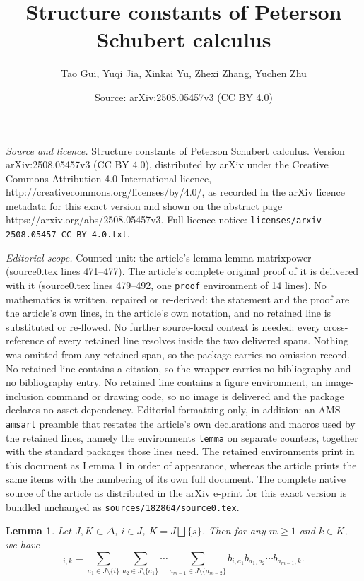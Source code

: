 \documentclass[10pt,a4paper]{amsart}
\title{Structure constants of Peterson Schubert calculus}
\author{Tao Gui, Yuqi Jia, Xinkai Yu, Zhexi Zhang, Yuchen Zhu}
\date{Source: arXiv:2508.05457v3 (CC BY 4.0)}
\newtheorem{lemma}{Lemma}
\begin{document}
\maketitle

\noindent\emph{Source and licence.} Structure constants of Peterson Schubert calculus. Version arXiv:2508.05457v3 (CC BY 4.0), distributed by arXiv under the Creative Commons Attribution 4.0 International licence, http://creativecommons.org/licenses/by/4.0/, as recorded in the arXiv licence metadata for this exact version and shown on the abstract page https://arxiv.org/abs/2508.05457v3. Full licence notice: \texttt{licenses/arxiv-2508.05457-CC-BY-4.0.txt}.\par\smallskip

\noindent\textit{Editorial scope.} Counted unit: the article's lemma lemma-matrixpower (source0.tex lines 471--477). The article's complete original proof of it is delivered with it (source0.tex lines 479--492, one \texttt{proof} environment of 14 lines). No mathematics is written, repaired or re-derived: the statement and the proof are the article's own lines, in the article's own notation, and no retained line is substituted or re-flowed.  No further source-local context is needed: every cross-reference of every retained line resolves inside the two delivered spans.  Nothing was omitted from any retained span, so the package carries no omission record.  No retained line contains a citation, so the wrapper carries no bibliography and no bibliography entry.  No retained line contains a figure environment, an image-inclusion command or drawing code, so no image is delivered and the package declares no asset dependency.  Editorial formatting only, in addition: an AMS \texttt{amsart} preamble that restates the article's own declarations and macros used by the retained lines, namely the environments \texttt{lemma} on separate counters, together with the standard packages those lines need.  The retained environments print in this document as Lemma 1 in order of appearance, whereas the article prints the same items with the numbering of its own full document.  The complete native source of the article as distributed in the arXiv e-print for this exact version is bundled unchanged as \texttt{sources/182864/source0.tex}.
\begin{lemma} \label{lemma-matrixpower}
Let $J,K\subset \Delta$, $i\in J$, $K=J \bigsqcup \{s\}$. Then for any $m\geq 1$ and $k\in K$, we have
\begin{equation*}
[(B_{K}^{\widehat{s}})^m]_{i,k}=\sum_{a_1\in J\setminus\{i\}}\sum_{a_2\in J\setminus\{a_1\}}\cdots\sum_{a_{m-1}\in J\setminus\{a_{m-2}\}}
b_{i,a_1}b_{a_1,a_2}\cdots b_{a_{m-1},k}.
\end{equation*}
\end{lemma}
\end{document}
